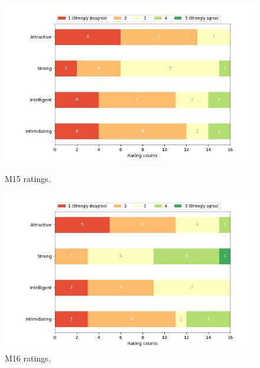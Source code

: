 \begin{figure}[H]
  \includegraphics[width=\linewidth]{Survey/MRatings/avatar_m15.png}
  \caption{M15 ratings.}
\endminipage\hfill
{}
  \includegraphics[width=\linewidth]{Survey/MRatings/avatar_m16.png}
  \caption{M16 ratings.}
\endminipage\hfill
\end{figure}
